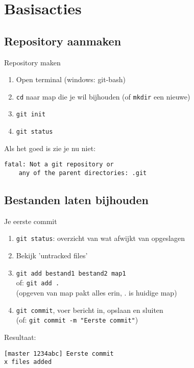 \section{Basisacties}

\subsection{Repository aanmaken}
\begin{frame}[fragile]{Repository maken}
	\begin{enumerate}
		\item Open terminal (windows: \alert{git-bash})
		\item \texttt{cd} naar map die je wil bijhouden
			(of \texttt{mkdir} een nieuwe)
		\item \texttt{git init}
		\item \texttt{git status}
	\end{enumerate}
	Als het goed is zie je nu \alert{niet}:
	\begin{verbatim}
fatal: Not a git repository or 
	any of the parent directories: .git
	\end{verbatim}
\end{frame}

\subsection{Bestanden laten bijhouden}
\begin{frame}[fragile]{Je eerste commit}
	\begin{enumerate}
		\item \texttt{git status}: overzicht van wat afwijkt van opgeslagen
		\item Bekijk 'untracked files'
		\item \texttt{git add bestand1 bestand2 map1}\\ of:
			\texttt{git add .}\\
			(opgeven van map pakt alles erin, . is huidige map)
		\item \texttt{git commit}, voer bericht in, opslaan en sluiten\\
			(of: \texttt{git commit -m "Eerste commit"})
	\end{enumerate}
	Resultaat: 
	\begin{verbatim}
[master 1234abc] Eerste commit
x files added
	\end{verbatim}
\end{frame}

